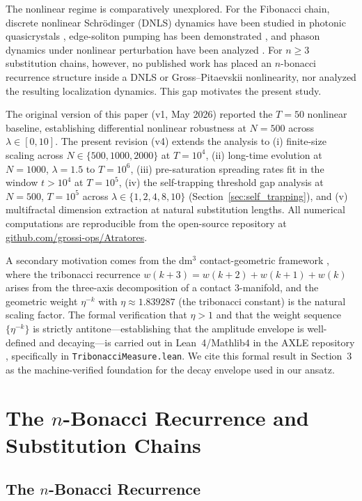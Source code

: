 \documentclass[12pt,a4paper]{article}
\begin{document}
The nonlinear regime is comparatively unexplored. For the Fibonacci chain,
discrete nonlinear Schr\"{o}dinger (DNLS) dynamics have been studied in
photonic quasicrystals \cite{Lahini2009}, edge-soliton pumping has been
demonstrated \cite{Jurgensen2021}, and phason dynamics under nonlinear
perturbation have been analyzed \cite{Verbin2015}. For $n \geq 3$
substitution chains, however, no published work has placed an $n$-bonacci
recurrence structure inside a DNLS or Gross--Pitaevskii nonlinearity, nor
analyzed the resulting localization dynamics. This gap motivates the present
study.

The original version of this paper (v1, May 2026) reported the $T=50$
nonlinear baseline, establishing differential nonlinear robustness at
$N=500$ across $\lambda \in [0,10]$. The present revision (v4) extends the
analysis to (i) finite-size scaling across $N \in \{500, 1000, 2000\}$ at
$T=10^4$, (ii) long-time evolution at $N=1000$, $\lambda=1.5$ to
$T=10^6$, (iii) pre-saturation spreading rates fit in the window
$t > 10^4$ at $T=10^5$, (iv) the self-trapping threshold gap analysis at
$N=500$, $T=10^5$ across $\lambda \in \{1, 2, 4, 8, 10\}$
(Section~\ref{sec:self_trapping}), and (v) multifractal dimension extraction at
natural substitution lengths. All numerical computations are reproducible
from the open-source repository at
\href{https://github.com/grossi-ops/Atratores}{github.com/grossi-ops/Atratores}.

A secondary motivation comes from the dm$^3$ contact-geometric framework
\cite{Grossi2026_Vol1,Grossi2026_Wavenumber6}, where the tribonacci
recurrence $w(k+3) = w(k+2) + w(k+1) + w(k)$ arises from the three-axis
decomposition of a contact 3-manifold, and the geometric weight $\eta^{-k}$
with $\eta \approx 1.839287$ (the tribonacci constant) is the natural scaling
factor. The formal verification that $\eta > 1$ and that the weight sequence
$\{\eta^{-k}\}$ is strictly antitone---establishing that the amplitude
envelope is well-defined and decaying---is carried out in Lean~4/Mathlib4 in
the AXLE repository \cite{AXLE2026}, specifically in
\texttt{TribonacciMeasure.lean}. We cite this formal result in Section~3 as
the machine-verified foundation for the decay envelope used in our ansatz.

\section{The $n$-Bonacci Recurrence and Substitution Chains}

\subsection{The $n$-Bonacci Recurrence}
\end{document}
